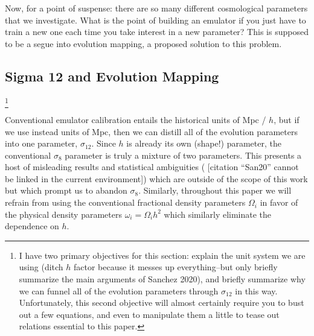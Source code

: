 \documentclass[11pt]{article}
\newcommand{\cbib}[1]
{\IfFileExists{biblatex.sty}
{\cite{#1}}
{[citation ``#1'' cannot be linked in the current environment]}}
\begin{document}
Now, for a point of suspense: there are so many different cosmological
parameters that we investigate. What is the point of building an emulator if
you just have to train a new one each time you take interest in a new
parameter? This is supposed to be a segue into evolution mapping, a proposed
solution to this problem.

\begin{centering}
\section{Sigma 12 and Evolution Mapping}
\label{sec: sigma_and_evMapping}
\end{centering}

\footnote{
    I have two primary objectives for this section: explain the unit system
    we are using (ditch $h$ factor because it messes up everything--but
    only briefly summarize the main arguments of Sanchez 2020), and briefly
    summarize why we can funnel all of the evolution parameters through
    $\sigma_{12}$ in this way. Unfortunately, this second objective will
    almost certainly require you to bust out a few equations, and even to
    manipulate them a little to tease out relations essential to this paper.
}

Conventional emulator calibration entails the historical units of Mpc / $h$,
but if we use instead units of Mpc, then we can distill all of the evolution
parameters into one parameter, $\sigma_{12}$. Since $h$ is already its own
(shape!) parameter, the conventional $\sigma_8$ parameter is truly a mixture
of two parameters. This presents a host of misleading results  and statistical
ambiguities (\cbib{San20}) which are outside of the scope of this work but
which prompt us to abandon $\sigma_8$.
Similarly, throughout this paper we will refrain from using the conventional
fractional density parameters $\Omega_i$ in favor of the physical density
parameters $\omega_i = \Omega_i h^2$ which similarly eliminate the
dependence on $h$.
\end{document}
